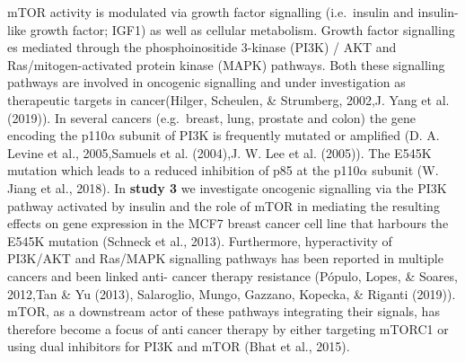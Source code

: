 \documentclass[12pt,openany]{book}
\begin{document}
mTOR activity is modulated via growth factor signalling (i.e.~insulin
and insulin-like growth factor; IGF1) as well as cellular metabolism.
Growth factor signalling es mediated through the phosphoinositide
3-kinase (PI3K) / AKT and Ras/mitogen-activated protein kinase (MAPK)
pathways. Both these signalling pathways are involved in oncogenic
signalling and under investigation as therapeutic targets in
cancer(Hilger, Scheulen, \& Strumberg, 2002,J. Yang et al. (2019)). In
several cancers (e.g.~breast, lung, prostate and colon) the gene
encoding the p110\(\alpha\) subunit of PI3K is frequently mutated or
amplified (D. A. Levine et al., 2005,Samuels et al. (2004),J. W. Lee et
al. (2005)). The E545K mutation which leads to a reduced inhibition of
p85 at the p110\(\alpha\) subunit (W. Jiang et al., 2018). In
\textbf{study 3} we investigate oncogenic signalling via the PI3K
pathway activated by insulin and the role of mTOR in mediating the
resulting effects on gene expression in the MCF7 breast cancer cell line
that harbours the E545K mutation (Schneck et al., 2013). Furthermore,
hyperactivity of PI3K/AKT and Ras/MAPK signalling pathways has been
reported in multiple cancers and been linked anti- cancer therapy
resistance (Pópulo, Lopes, \& Soares, 2012,Tan \& Yu (2013), Salaroglio,
Mungo, Gazzano, Kopecka, \& Riganti (2019)). mTOR, as a downstream actor
of these pathways integrating their signals, has therefore become a
focus of anti cancer therapy by either targeting mTORC1 or using dual
inhibitors for PI3K and mTOR (Bhat et al., 2015).
\end{document}
